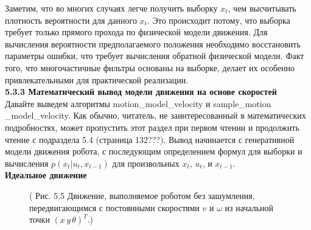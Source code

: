 \documentclass[10pt,a4paper]{article}
\begin{document}
Заметим, что во многих случаях легче получить выборку $x_t$, чем высчитывать плотность вероятности для данного $x_t$. Это происходит потому, что выборка требует только прямого прохода по физической модели движения. Для вычисления вероятности предполагаемого положения необходимо восстановить параметры ошибки, что требует вычисления обратной физической модели. Факт того, что многочастичные фильтры основаны на выборке, делает их особенно привлекательными для практической реализации.\\ 

\textbf{5.3.3 Математический вывод модели движения на основе скоростей} \\

Давайте выведем алгоритмы motion\_model\_velocity и sample\_motion \_model\_velocity. Как обычно, читатель, не заинтересованный в математических подробностях, может пропустить этот раздел при первом чтении и продолжить чтение с подраздела 5.4 (страница 132???). Вывод начинается с генеративной модели движения робота, с последующим определением формул для выборки и вычисления $p(x_t | u_t, x_{t-1})$ для произвольных $x_t$, $u_t$, и $x_{t-1}$.\\

\textbf{Идеальное движение}\\

\begin{figure}[H]
	\caption{ (  Рис. 5.5 Движение, выполняемое роботом без зашумления, передвигающимся с постоянными скоростями 
	$v$ и $\omega$ из начальной точки $(x\,y\,\theta)^T$.)}
	\label{fig:55orig}
\end{figure}
\end{document}
